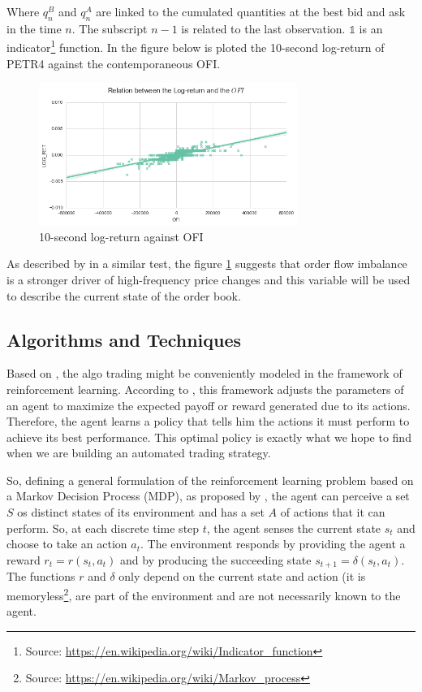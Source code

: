 \documentclass[a4paper]{article}
\begin{document}
Where $q^{B}_{n}$ and $q^{A}_{n}$ are linked to the cumulated quantities at the best bid and ask in the time $n$. The subscript $n-1$ is related to the last observation. $\mathbb{1}$ is an indicator\footnote{Source: \url{https://en.wikipedia.org/wiki/Indicator_function}} function. In the figure below is ploted the 10-second log-return of PETR4 against the contemporaneous OFI.

\begin{figure}[ht!]
\centering
\includegraphics[width=0.75\textwidth]{figures/ofi_logret.png}
\caption{\label{fig:ofi_linear}10-second log-return against OFI}
\end{figure}

As described by \cite{cont2014price} in a similar test, the figure \ref{fig:ofi_linear} suggests that order flow imbalance is a stronger driver of high-frequency price changes and this variable will be used to describe the current state of the order book.

\subsection{Algorithms and Techniques}
Based on \cite{cont2014price}, the algo trading might be conveniently modeled in the framework of reinforcement learning. According to \cite{du1algorithm}, this framework adjusts the parameters of an agent to maximize the expected payoff or reward generated due to its actions. Therefore, the agent learns a policy that tells him the actions it must perform to achieve its best performance. This optimal policy is exactly what we hope to find when we are building an automated trading strategy.

So, defining a general formulation of the reinforcement learning problem based on a Markov Decision Process (MDP), as proposed by \cite{Mitchell}, the agent can perceive a set $S$ os distinct states of its environment and has a set $A$ of actions that it can perform. So, at each discrete time step $t$, the agent senses the current state $s_t$ and choose to take an action $a_t$. The environment responds by providing the agent a reward $r_t=r(s_t, a_t)$ and by producing the succeeding state $s_{t+1}=\delta(s_t, a_t)$. The functions $r$ and $\delta$ only depend on the current state and action (it is memoryless\footnote{Source: \url{https://en.wikipedia.org/wiki/Markov_process}}, are part of the environment and are not necessarily known to the agent.
\end{document}

